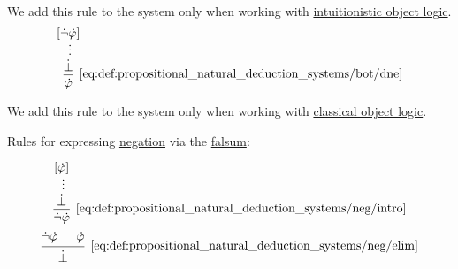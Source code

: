 \begin{definition}
\begin{thmenum}
\begin{TwoColumns}
      We add this rule to the system only when working with \hyperref[def:intuitionistic_logic]{intuitionistic object logic}.
    \BeginSecondColumn
      \begin{equation*}\taglabel[\logic{DNE}]{eq:def:propositional_natural_deduction_systems/bot/dne}
        \begin{prooftree}
          \hypo{ [\synneg \syn\varphi] }
          \ellipsis {} { \synbot }
          \infer1[\ref{eq:def:propositional_natural_deduction_systems/bot/dne}]{ \syn\varphi }
        \end{prooftree}
      \end{equation*}

      We add this rule to the system only when working with \hyperref[def:classical_logic]{classical object logic}.
    \end{TwoColumns}

     Rules for expressing \hyperref[def:propositional_alphabet/negation]{negation} via the \hyperref[def:propositional_alphabet/constants/falsum]{falsum}:
    \begin{TwoColumns}
      \begin{equation*}\taglabel[\( \neg^+ \)]{eq:def:propositional_natural_deduction_systems/neg/intro}
        \begin{prooftree}
          \hypo{ [\syn\varphi] }
          \ellipsis {} { \synbot }
          \infer1[\ref{eq:def:propositional_natural_deduction_systems/neg/intro}]{ \synneg \syn\varphi }
        \end{prooftree}
      \end{equation*}
    \BeginSecondColumn
      \begin{equation*}\taglabel[\( \neg^- \)]{eq:def:propositional_natural_deduction_systems/neg/elim}
        \begin{prooftree}
          \hypo{ \synneg \syn\varphi }
          \hypo{ \syn\varphi }
          \infer2[\ref{eq:def:propositional_natural_deduction_systems/neg/elim}]{ \synbot }
        \end{prooftree}
      \end{equation*}
    \end{TwoColumns}


\end{thmenum}
\end{definition}
